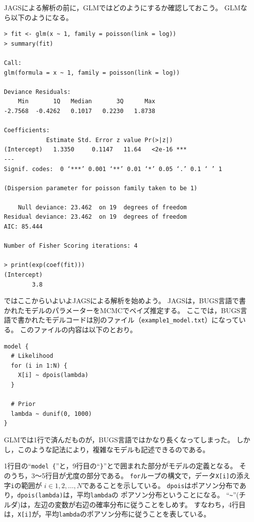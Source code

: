 \documentclass[11pt,uplatex]{jsarticle}
\begin{document}
\textsf{JAGS}による解析の前に，GLMではどのようにするか確認しておこう。
GLMなら以下のようになる。
\begin{lstlisting}
> fit <- glm(x ~ 1, family = poisson(link = log))
> summary(fit)

Call:
glm(formula = x ~ 1, family = poisson(link = log))

Deviance Residuals: 
    Min       1Q   Median       3Q      Max  
-2.7568  -0.4262   0.1017   0.2230   1.8738  

Coefficients:
            Estimate Std. Error z value Pr(>|z|)    
(Intercept)   1.3350     0.1147   11.64   <2e-16 ***
---
Signif. codes:  0 ‘***’ 0.001 ‘**’ 0.01 ‘*’ 0.05 ‘.’ 0.1 ‘ ’ 1

(Dispersion parameter for poisson family taken to be 1)

    Null deviance: 23.462  on 19  degrees of freedom
Residual deviance: 23.462  on 19  degrees of freedom
AIC: 85.444

Number of Fisher Scoring iterations: 4

> print(exp(coef(fit)))
(Intercept) 
        3.8 
\end{lstlisting}

\vspace{1zw}

ではここからいよいよ\textsf{JAGS}による解析を始めよう。
\textsf{JAGS}は，\textsf{BUGS}言語で書かれたモデルのパラメーターをMCMCでベイズ推定する。
ここでは，\textsf{BUGS}言語で書かれたモデルコードは別のファイル（\texttt{example1\_model.txt}）になっている。
このファイルの内容は以下のとおり。
\begin{lstlisting}
model {
  # Likelihood
  for (i in 1:N) {
    X[i] ~ dpois(lambda)
  }

  # Prior
  lambda ~ dunif(0, 1000)
}
\end{lstlisting}
%
GLMでは1行で済んだものが，\textsf{BUGS言語}ではかなり長くなってしまった。
しかし，このような記法により，複雑なモデルも記述できるのである。

1行目の``\texttt{model \{}''と，9行目の``\texttt{\}}''とで囲まれた部分がモデルの定義となる。
そのうち，3〜5行目が尤度の部分である。
\texttt{for}ループの構文で，データ\texttt{X[i]}の添え字\texttt{i}の範囲が
$i \in 1, 2, \dots, N$であることを示している。
\texttt{dpois}はポアソン分布であり，\texttt{dpois(lambda)}は，平均\texttt{lambda}の
ポアソン分布ということになる。
``\texttt{\textasciitilde}''(チルダ)は，左辺の変数が右辺の確率分布に従うことをしめす。
すなわち，4行目は，\texttt{X[i]}が，平均\texttt{lambda}のポアソン分布に従うことを表している。
\end{document}
